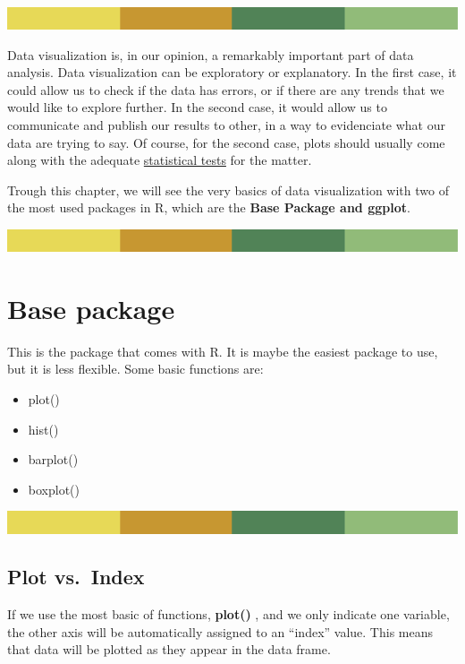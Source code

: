 \documentclass[
]{book}
\providecommand{\tightlist}{%
  \setlength{\itemsep}{0pt}\setlength{\parskip}{0pt}}
\begin{document}
\includegraphics{rsrstrip.png}

Data visualization is, in our opinion, a remarkably important part of data analysis. Data visualization can be exploratory or explanatory. In the first case, it could allow us to check if the data has errors, or if there are any trends that we would like to explore further. In the second case, it would allow us to communicate and publish our results to other, in a way to evidenciate what our data are trying to say. Of course, for the second case, plots should usually come along with the adequate \protect\hyperlink{statistical-tests}{statistical tests} for the matter.

Trough this chapter, we will see the very basics of data visualization with two of the most used packages in R, which are the \textbf{Base Package and ggplot}.

\includegraphics{rsrstrip.png}

\hypertarget{base-package}{%
\section{Base package}\label{base-package}}

This is the package that comes with R. It is maybe the easiest package to use, but it is less flexible. Some basic functions are:

\begin{itemize}
\tightlist
\item
  plot()
\item
  hist()
\item
  barplot()
\item
  boxplot()
\end{itemize}

\includegraphics{rsrstrip.png}

\hypertarget{plot-vs.-index}{%
\subsection{Plot vs.~Index}\label{plot-vs.-index}}

If we use the most basic of functions, \textbf{plot() }, and we only indicate one variable, the other axis will be automatically assigned to an ``index'' value. This means that data will be plotted as they appear in the data frame.
\end{document}
